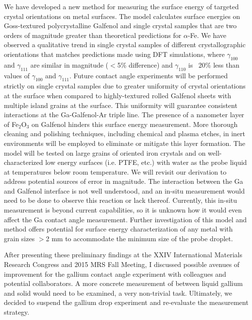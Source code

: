 We have developed a new method for measuring the surface energy of targeted crystal orientations on metal surfaces. The model calculates surface energies on Goss-textured polycrystalline Galfenol and single crystal samples that are two orders of magnitude greater than theoretical predictions for $\alpha$-Fe. We have observed a qualitative trend in single crystal samples of different crystallographic orientations that matches predictions made using DFT simulations, where $\gamma_{100}$ and $\gamma_{111}$  are similar in magnitude ($<$5\% difference) and $\gamma_{110}$ is ~20\% less than values of $\gamma_{100}$ and $\gamma_{111}$. Future contact angle experiments will be performed strictly on single crystal samples due to greater uniformity of crystal orientations at the surface when compared to highly-textured rolled Galfenol sheets with multiple island grains at the surface. This uniformity will guarantee consistent interactions at the Ga-Galfenol-Ar triple line. The presence of a nanometer layer of Fe$_2$O$_3$ on Galfenol hinders this surface energy measurement. More thorough cleaning and polishing techniques, including chemical and plasma etches, in inert environments will be employed to eliminate or mitigate this layer formation. The model will be tested on large grains of oriented iron crystals and on well-characterized low energy surfaces (i.e. PTFE, etc.) with water as the probe liquid at temperatures below room temperature. We will revisit our derivation to address potential sources of error in magnitude. The interaction between the Ga and Galfenol interface is not well understood, and an in-situ measurement would need to be done to observe this reaction or lack thereof. Currently, this in-situ measurement is beyond current capabilities, so it is unknown how it would even affect the Ga contact angle measurement. Further investigation of this model and method offers potential for surface energy characterization of any metal with grain sizes $ > $2 mm to accommodate the minimum size of the probe droplet.

After presenting these preliminary findings at the XXIV International Materials Research Congress and 2015 MRS Fall Meeting,\cite{VanOrder2015a,VanOrder2015} I discussed possible avenues of improvement for the gallium contact angle experiment with colleagues and potential collaborators. A more concrete measurement of \gamSL between liquid gallium and solid would need to be examined, a very non-trivial task. Ultimately, we decided to suspend the gallium drop experiment and re-evaluate the measurement strategy. 
 
